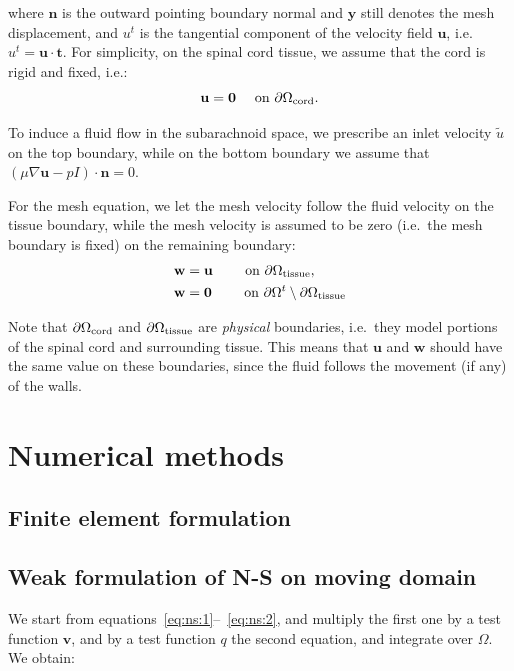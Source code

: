 \documentclass[11pt,a4paper,titlepage]{report}
\begin{document}
where $\mathbf{n}$ is the outward pointing boundary normal and
$\mathbf{y}$ still denotes the mesh displacement, and $u^t$ is the tangential component of the velocity field $\mathbf{u}$, i.e. $u^t = \mathbf{u} \cdot \mathbf{t}$. For simplicity, on
the spinal cord tissue, we assume that the cord is rigid and fixed,
i.e.:
\begin{equation}
  \mathbf{u} = \mathbf{0} \quad \text { on } \partial \Omega_{\rm cord}.
\end{equation}

To induce a fluid flow in the subarachnoid space, we prescribe an
inlet velocity $\tilde{u}$ on the top boundary, while on the bottom
boundary we assume that $ \left ( \mu \nabla \mathbf{u} - p I \right )
\cdot \mathbf{n} = 0$.

For the mesh equation, we let the mesh velocity follow the fluid
velocity on the tissue boundary, while the mesh velocity is assumed to
be zero (i.e.~the mesh boundary is fixed) on the remaining boundary:
\begin{align}
\label{eq:bc:5}
\mathbf{w} &= \mathbf{u}  \qquad \text{ on } \partial \Omega_{\rm tissue},\\
\mathbf{w} &= \mathbf{0}  \qquad \text{ on } \partial \Omega^t \setminus \partial \Omega_{\rm tissue}
\end{align}

Note that $\partial \Omega_{\rm cord}$ and $\partial \Omega_{\rm
  tissue}$ are \textit{physical} boundaries, i.e.~they model portions
of the spinal cord and surrounding tissue. This means that
$\mathbf{u}$ and $\mathbf{w}$ should have the same value on these
boundaries, since the fluid follows the movement (if any) of the
walls.


\chapter{Numerical methods}

\section{Finite element formulation}

\section{Weak formulation of N-S on moving domain}
We start from equations~\eqref{eq:ns:1}--~\eqref{eq:ns:2}, and multiply the first one by a test function $\mathbf{v}$, and by a test function $q$ the second equation, and integrate over $\Omega$. We obtain:
\end{document}

